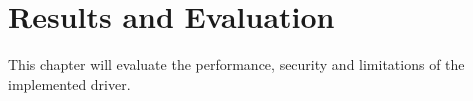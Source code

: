 \section{Results and Evaluation}
\label{sec:evaluation}
This chapter will evaluate the performance, security and limitations of the implemented driver.


